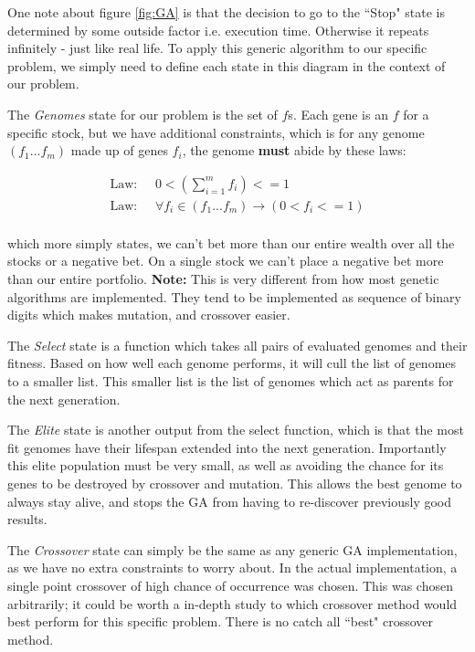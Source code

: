 \documentclass[11pt]{article}
\begin{document}
    One note about figure \ref{fig:GA} is that the decision to go to the ``Stop"
    state is determined by some outside factor i.e. execution time. Otherwise
    it repeats infinitely - just like real life. To apply this generic algorithm to 
    our specific problem, we simply need to
    define each state in this diagram in the context of our problem.

    The \textit{Genomes} state for our problem is the set of \(f\)s. Each gene is an
    \(f\) for a specific stock, but we have additional constraints, which is for 
    any genome \((f_1...f_m)\) made up of genes \(f_i\), the genome \textbf{must}
    abide by these laws:

    \begin{align*}
        \text{Law: } & \;
        0 < \left(
            \displaystyle\sum^{m}_{i=1} f_i
        \right) <= 1 \\
        \text{Law: } & \;
        \forall f_i \in (f_1...f_m) \to \left(
            0 < f_i <= 1
        \right) \\
    \end{align*}

    which more simply states, we can't bet more than our entire wealth over all the stocks or
    a negative bet. On a single stock we can't place a negative bet more than our
    entire portfolio. \textbf{Note:} This is very different from how most genetic algorithms
    are implemented. They tend to be implemented as sequence of binary digits which makes
    mutation, and crossover easier. 

    The \textit{Select} state is a function which takes all pairs of evaluated genomes
    and their fitness. Based on how well each genome performs, it will cull the
    list of genomes to a smaller list. This smaller list is the list of genomes
    which act as parents for the next generation.

    The \textit{Elite} state is another output from the select function, which is
    that the most fit genomes have their lifespan extended into the next generation.
    Importantly this elite population must be very small, as well as avoiding the
    chance for its genes to be destroyed by crossover and mutation. \cite{DeJong}
    This allows the best genome to always stay alive, and stops the GA from
    having to re-discover previously good results.

    The \textit{Crossover} state can simply be the same as any generic GA implementation,
    as we have no extra constraints to worry about. In the actual implementation,
    a single point crossover of high chance of occurrence was chosen. This was
    chosen arbitrarily; it could be worth a in-depth study to which crossover
    method would best perform for this specific problem. There is no catch all
    ``best" crossover method.
\end{document}
